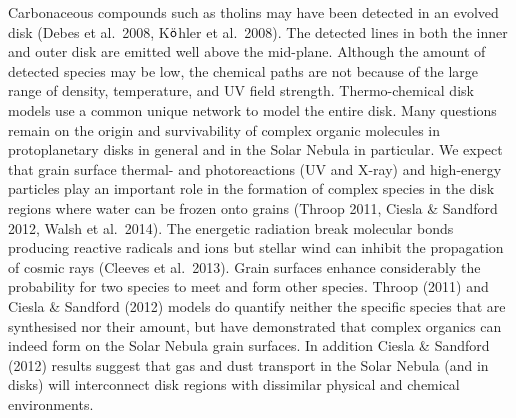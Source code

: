 \documentclass[10pt,fleqn,twoside]{article}
\begin{document}
Carbonaceous compounds such as tholins may have been detected in an evolved disk (Debes et al.\ 2008, K$\ddot{\textsf o}$hler et al.\ 2008). The detected lines in both the inner and outer disk are emitted well above the mid-plane. Although the amount of detected species may be low, the chemical paths are not because of the large range of density, temperature, and UV field strength. Thermo-chemical disk models use a common unique network to model the entire disk. Many questions remain on the origin and survivability of complex organic molecules in protoplanetary disks in general and in the Solar Nebula in particular. We expect that grain surface thermal- and photoreactions (UV and X-ray) and high-energy particles play an important role in the formation of complex species in the disk regions where water can be frozen onto grains (Throop 2011, Ciesla \& Sandford 2012, Walsh et al.\ 2014). The energetic radiation break molecular bonds producing reactive radicals and ions but stellar wind can inhibit the propagation of cosmic rays (Cleeves et al.\ 2013). Grain surfaces enhance considerably the probability for two species to meet and form other species. Throop (2011) and Ciesla \& Sandford (2012) models do quantify neither the specific species that are synthesised nor their amount, but have demonstrated that complex organics can indeed form on the Solar Nebula grain surfaces. In addition Ciesla \& Sandford (2012) results suggest that gas and dust transport in the Solar Nebula (and in disks) will interconnect disk regions with dissimilar physical and chemical environments.
\end{document}
